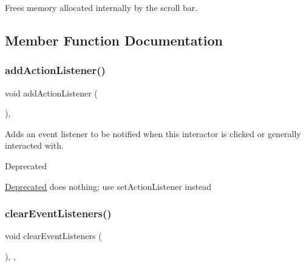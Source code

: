 Frees memory allocated internally by the scroll bar. 



\subsection{Member Function Documentation}
\mbox{\label{classGInteractor_a02f20ea6edfa0671f31c4c648a253833}} 
\subsubsection{\texorpdfstring{add\+Action\+Listener()}{addActionListener()}}
{\footnotesize\ttfamily void add\+Action\+Listener (\begin{DoxyParamCaption}{ }\end{DoxyParamCaption})\hspace{0.3cm}{\ttfamily [virtual]}, {\ttfamily [inherited]}}



Adds an event listener to be notified when this interactor is clicked or generally interacted with. 

\begin{DoxyRefDesc}{Deprecated}
\item[\mbox{\hyperlink{deprecated__deprecated000006}{Deprecated}}]does nothing; use set\+Action\+Listener instead \end{DoxyRefDesc}
\mbox{\label{classGObservable_a80cfa040459ff53594adbd6a51ec8f43}} 
\subsubsection{\texorpdfstring{clear\+Event\+Listeners()}{clearEventListeners()}}
{\footnotesize\ttfamily void clear\+Event\+Listeners (\begin{DoxyParamCaption}{ }\end{DoxyParamCaption})\hspace{0.3cm}{\ttfamily [protected]}, {\ttfamily [virtual]}, {\ttfamily [inherited]}}




